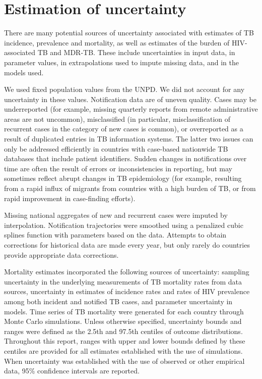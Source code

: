 \section{Estimation of uncertainty}

There are many potential sources of uncertainty associated with estimates of TB incidence, prevalence and mortality, as well as estimates of the burden of HIV-associated TB and MDR-TB. These include uncertainties in input data, in parameter values, in extrapolations used to impute missing data, and in the models used. 

We used fixed population values from the UNPD. We did not account for any uncertainty in these values.  
Notification data are of uneven quality. Cases may be underreported (for example, missing quarterly reports from remote administrative areas are not uncommon), misclassified (in particular, misclassification of recurrent cases in the category of new cases is common), or overreported as a result of duplicated entries in TB information systems. The latter two issues can only be addressed efficiently in countries with case-based nationwide TB databases that include patient identifiers. Sudden changes in notifications over time are often the result of errors or inconsistencies in reporting, but may sometimes reflect abrupt changes in TB epidemiology (for example, resulting from a rapid influx of migrants from countries with a high burden of TB, or from rapid improvement in case-finding efforts). 

Missing national aggregates of new and recurrent cases were imputed by interpolation. Notification trajectories were smoothed using a penalized cubic splines function with parameters based on the data. Attempts to obtain corrections for historical data are made every year, but only rarely do countries provide appropriate data corrections. 

Mortality estimates incorporated the following sources of uncertainty: sampling uncertainty in the underlying measurements of TB mortality rates from data sources, uncertainty in estimates of incidence rates and rates of HIV prevalence among both incident and notified TB cases, and parameter uncertainty in models. Time series of TB mortality were generated for each country through Monte Carlo simulations. 
Unless otherwise specified, uncertainty bounds and ranges were defined as the 2.5th and 97.5th centiles of outcome distributions. Throughout this report, ranges with upper and lower bounds defined by these centiles are provided for all estimates established with the use of simulations. When uncertainty was established with the use of observed or other empirical data, 95\% confidence intervals are reported.
 
